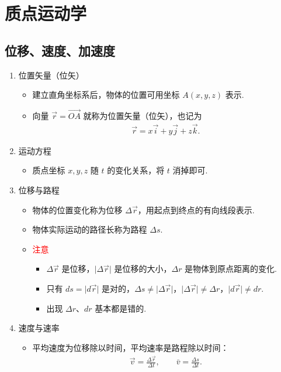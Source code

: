 \section{质点运动学}

\subsection{位移、速度、加速度}

\begin{enumerate}
	\item 位置矢量（位矢）
	\begin{itemize}
		\item 建立直角坐标系后，物体的位置可用坐标 $A(x,y,z)$ 表示.
		\item 向量 $\vec{r}=\overrightarrow{OA}$ 就称为位置矢量（位矢），也记为
		\begin{align*}
			\vec{r}=x\vec{i}+y\vec{j}+z\vec{k}.
		\end{align*}
	\end{itemize}
	
	\item 运动方程
	\begin{itemize}
		\item 质点坐标 $x,y,z$ 随 $t$ 的变化关系，将 $t$ 消掉即可.
	\end{itemize}

	\item 位移与路程
	\begin{itemize}
		\item 物体的位置变化称为位移 $\Delta \vec{r}$，用起点到终点的有向线段表示.
		\item 物体实际运动的路径长称为路程 $\Delta s$.
		\item \textcolor{red}{注意}
		\begin{itemize}
			\item $\Delta \vec{r}$ 是位移，$\lvert \Delta \vec{r} \rvert$ 是位移的大小，$\Delta r$ 是物体到原点距离的变化.
			\item 只有 $ds=\lvert d\vec{r} \rvert$ 是对的，$\Delta s \neq \lvert \Delta \vec{r} \rvert$，$\lvert \Delta \vec{r} \rvert \neq \Delta r$，$\lvert d\vec{r} \rvert \neq dr$.
			\item 出现 $\Delta r$、$dr$ 基本都是错的.
		\end{itemize}
	\end{itemize}
	
	\item 速度与速率
	\begin{itemize}
		\item 平均速度为位移除以时间，平均速率是路程除以时间：
		\begin{align*}
			\vec{v}=\frac{\Delta \vec{r}}{\Delta t}, 
			\qquad
			\bar{v}=\frac{\Delta s}{\Delta t}.
		\end{align*}
		

\end{itemize}
\end{enumerate}

